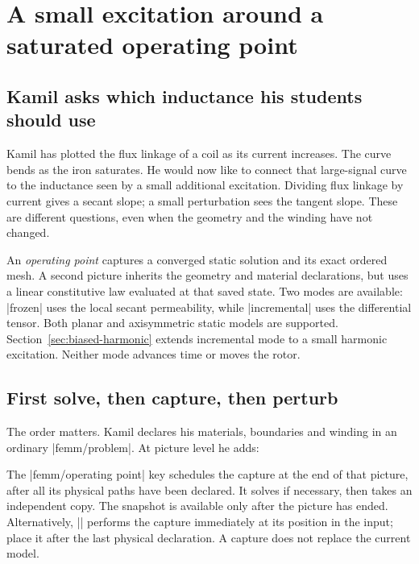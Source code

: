 \section{A small excitation around a saturated operating point}
\label{sec:operating}

\subsection{Kamil asks which inductance his students should use}
Kamil has plotted the flux linkage of a coil as its current increases.
The curve bends as the iron saturates. He would now like to connect that
large-signal curve to the inductance seen by a small additional excitation.
Dividing flux linkage by current gives a secant slope; a small perturbation
sees the tangent slope. These are different questions, even when the geometry
and the winding have not changed.

An \emph{operating point} captures a converged static solution and its exact
ordered mesh. A second picture inherits the geometry and material declarations,
but uses a linear constitutive law evaluated at that saved state. Two modes
are available: |frozen| uses the local secant permeability, while
|incremental| uses the differential tensor. Both planar and axisymmetric
static models are supported. Section~\ref{sec:biased-harmonic} extends incremental
mode to a small harmonic excitation. Neither mode advances time or moves the rotor.

\subsection{First solve, then capture, then perturb}
The order matters. Kamil declares his materials, boundaries and winding in
an ordinary |femm/problem|. At picture level he adds:
\begin{codeexample}
\end{codeexample}
The |femm/operating point| key schedules the capture at the end of that
picture, after all its physical paths have been declared. It solves if
necessary, then takes an independent copy. The snapshot is available only
after the picture has ended. Alternatively,
|\femmoperatingpoint[name=bias]| performs the capture immediately at its
position in the input; place it after the last physical declaration.
A capture does not replace the current model.

